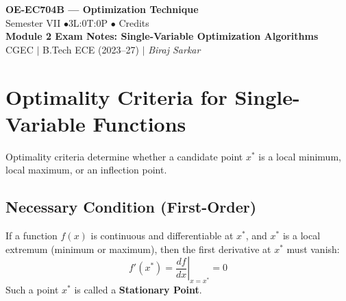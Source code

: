 \documentclass[12pt,a4paper]{article}
\begin{document}

\begin{center}
  {\LARGE\bfseries\color{myred} OE-EC704B --- Optimization Technique}\\[5pt]
  {\normalsize\color{mydark} Semester VII \quad$\bullet$\quad 3L:0T:0P \quad$\bullet$ Credits}\\[3pt]
  {\normalsize\color{myteal}\textbf{Module 2 Exam Notes: Single-Variable Optimization Algorithms}}\\[3pt]
  {\small\color{mydark} CGEC \;$|$\; B.Tech ECE (2023--27) \;$|$\; \textit{Biraj Sarkar}}
\end{center}
\vspace{2pt}
\noindent{\color{myred}\rule{\linewidth}{1.5pt}}
\vspace{2pt}

\hypersetup{linkcolor=mydark}
\tableofcontents
\hypersetup{linkcolor=myteal}
\newpage

\section{Optimality Criteria for Single-Variable Functions}

Optimality criteria determine whether a candidate point $x^*$ is a local minimum, local maximum, or an inflection point.

\subsection{Necessary Condition (First-Order)}
\begin{tcolorbox}[defbox, title={Theorem: Necessary Condition}]
If a function $f(x)$ is continuous and differentiable at $x^*$, and $x^*$ is a local extremum (minimum or maximum), then the first derivative at $x^*$ must vanish:
\begin{equation}
  f'(x^*) = \left. \frac{df}{dx} \right|_{x = x^*} = 0
\end{equation}
Such a point $x^*$ is called a \textbf{Stationary Point}.
\end{tcolorbox}
\end{document}

